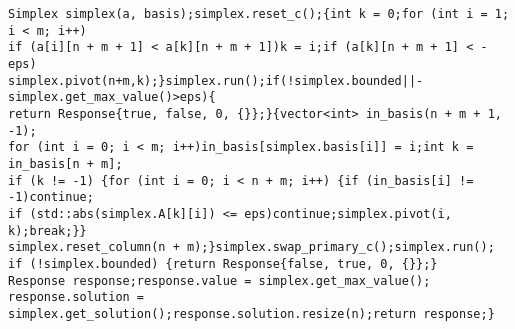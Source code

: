 \documentclass[12pt]{article}
\begin{document}
\begin{verbatim}
Simplex simplex(a, basis);simplex.reset_c();{int k = 0;for (int i = 1; i < m; i++)
if (a[i][n + m + 1] < a[k][n + m + 1])k = i;if (a[k][n + m + 1] < -eps)
simplex.pivot(n+m,k);}simplex.run();if(!simplex.bounded||-simplex.get_max_value()>eps){
return Response{true, false, 0, {}};}{vector<int> in_basis(n + m + 1, -1);
for (int i = 0; i < m; i++)in_basis[simplex.basis[i]] = i;int k = in_basis[n + m];
if (k != -1) {for (int i = 0; i < n + m; i++) {if (in_basis[i] != -1)continue;
if (std::abs(simplex.A[k][i]) <= eps)continue;simplex.pivot(i, k);break;}}
simplex.reset_column(n + m);}simplex.swap_primary_c();simplex.run();
if (!simplex.bounded) {return Response{false, true, 0, {}};}
Response response;response.value = simplex.get_max_value();
response.solution = simplex.get_solution();response.solution.resize(n);return response;}
\end{verbatim}






\end{document}
